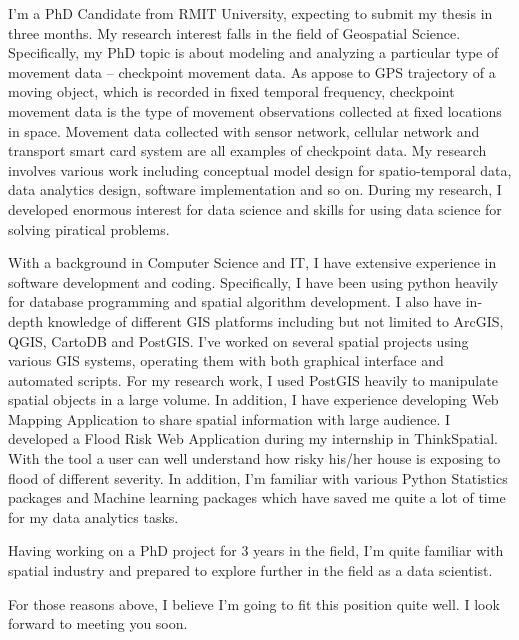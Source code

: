 \documentclass[11pt, a4paper]{awesome-cv} %
\begin{document}
\makecvheader %

\makelettertitle %


\begin{cvletter}



I'm a PhD Candidate from RMIT University, expecting to submit my thesis in three months. My research interest falls in the field of Geospatial Science. Specifically, my PhD topic is about modeling and analyzing a particular type of movement data -- checkpoint movement data. 
As appose to GPS trajectory of a moving object, which is recorded in fixed temporal frequency, checkpoint movement data is the type of movement observations collected at fixed locations in space. Movement data collected with sensor network, cellular network and transport smart card system are all examples of checkpoint data.
My research involves various work including conceptual model design for spatio-temporal data, data analytics design, software implementation and so on. 
During my research, I developed enormous interest for data science and skills for using data science for solving piratical problems.

With a background in Computer Science and IT, I have extensive experience in software development and coding.  
Specifically, I have been using python heavily for database programming and spatial algorithm development.
I also have in-depth knowledge of different GIS platforms including but not limited to ArcGIS, QGIS, CartoDB and PostGIS. I've worked on several spatial projects using various GIS systems, operating them with both graphical interface and automated scripts. For my research work, I used PostGIS heavily to manipulate spatial objects in a large volume.
In addition, I have experience developing Web Mapping Application to share spatial information with large audience. I developed a Flood Risk Web Application during my internship in ThinkSpatial. With the tool a user can well understand how risky his/her house is exposing to flood of different severity.
In addition, I'm familiar with various Python Statistics packages and Machine learning packages which have saved me quite a lot of time for my data analytics tasks.

Having working on a PhD project for 3 years in the field, I'm quite familiar with spatial industry and prepared to explore further in the field as a data scientist.

For those reasons above, I believe I'm going to fit this position quite well. 
I look forward to meeting you soon.






\end{cvletter}


\makeletterclosing %
\end{document}
